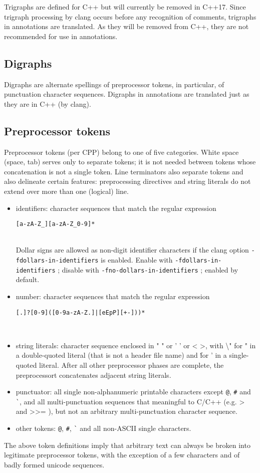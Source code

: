 Trigraphs are defined for C++ but will currently be removed in C++17. Since trigraph processing by clang occurs before any recognition of comments, trigraphs in \acslpp annotations are translated. As they will be removed from C++, they are not recommended for use in \acslpp annotations.

\subsection{Digraphs}
Digraphs are alternate spellings of preprocessor tokens, in particular, of
punctuation character sequences. Digraphs in \acslpp annotations are translated just as they are in C++ (by clang).

\subsection{Preprocessor tokens}
Preprocessor tokens (per CPP) belong to one of five categories. White space (space, tab) serves only to separate tokens; it is not needed between tokens whose concatenation is not a single token. Line terminators also separate tokens and also delineate certain features: preprocessing directives and string literals do not extend over more than one (logical) line.
\begin{itemize}
	\item identifiers: character sequences that match the regular expression \\
\centerline{\texttt{[a-zA-Z\_][a-zA-Z\_0-9]*}} \\ Dollar signs are allowed as non-digit identifier characters if the clang option \texttt{-fdollars-in-identifiers} is enabled. 
Enable with \texttt{-fdollars-in-identifiers} ; disable with \texttt{-fno-dollars-in-identifiers} ; enabled by default.
	\item number: character sequences that match the regular expression  \\
\centerline{\texttt{[.]?[0-9]([0-9a-zA-Z.]|[eEpP][+-]))*}}  \\

	\item string literals: character sequence enclosed in " " or ' ' or < >, with \textbackslash " for " in a double-quoted literal (that is not a header file name) and \' for ' in a single-quoted literal. After all other preprocessor phases are complete, the preprocessort concatenates adjacent string literals.
	\item punctuator: all single non-alphanumeric printable characters except 
\verb|@|, \verb|#| and \verb|`|, and all multi-punctuation sequences that meaningful to C/C++ (e.g. > and >{>}= ), but not an arbitrary multi-punctuation character sequence.
	\item other tokens: \verb|@|, \verb|#|, \verb|`| and all non-ASCII single characters.
\end{itemize}
The above token definitions imply that arbitrary text can always be broken into
legitimate preprocessor tokens, with the exception of a few characters and of badly formed unicode sequences.


